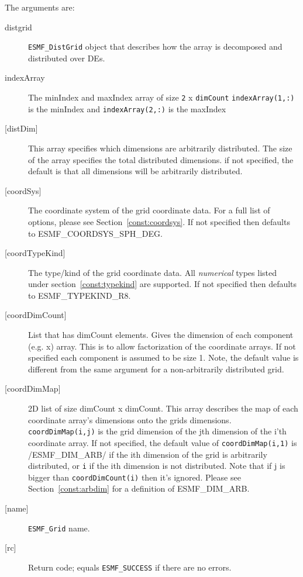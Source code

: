    The arguments are:
   \begin{description}
   \item[distgrid]
        {\tt ESMF\_DistGrid} object that describes how the array is decomposed and
        distributed over DEs.
   \item[indexArray]
        The minIndex and maxIndex array of size {\tt 2} x {\tt dimCount}
        {\tt indexArray(1,:)} is the minIndex and {\tt indexArray(2,:)} is the maxIndex
   \item[{[distDim]}]
         This array specifies which dimensions are arbitrarily distributed.
         The size of the array specifies the total distributed dimensions.
         if not specified, the default is that all dimensions will be arbitrarily
         distributed.
   \item[{[coordSys]}]
       The coordinate system of the grid coordinate data.
       For a full list of options, please see Section~\ref{const:coordsys}.
       If not specified then defaults to ESMF\_COORDSYS\_SPH\_DEG.
   \item[{[coordTypeKind]}]
       The type/kind of the grid coordinate data. All {\em numerical} types
       listed under section~\ref{const:typekind} are supported.
       If not specified then defaults to ESMF\_TYPEKIND\_R8.
   \item[{[coordDimCount]}]
        List that has dimCount elements.
        Gives the dimension of each component (e.g. x) array. This is
        to allow factorization of the coordinate arrays. If not specified
        each component is assumed to be size 1. Note, the default value is different
        from the same argument for a non-arbitrarily distributed grid.
   \item[{[coordDimMap]}]
        2D list of size dimCount x dimCount. This array describes the
        map of each coordinate array's dimensions onto the grids
        dimensions.  {\tt coordDimMap(i,j)} is the grid dimension of the jth dimension
        of the i'th coordinate array.  If not specified, the default value of
        {\tt coordDimMap(i,1)} is /ESMF\_DIM\_ARB/ if the ith dimension of the grid is
        arbitrarily distributed, or {\tt i} if the ith dimension is not distributed.
        Note that if j is bigger than {\tt coordDimCount(i)} then it's ignored.
        Please see Section~\ref{const:arbdim} for a definition of ESMF\_DIM\_ARB.
   \item[{[name]}]
       {\tt ESMF\_Grid} name.
   \item[{[rc]}]
        Return code; equals {\tt ESMF\_SUCCESS} if there are no errors.
   \end{description}
   
